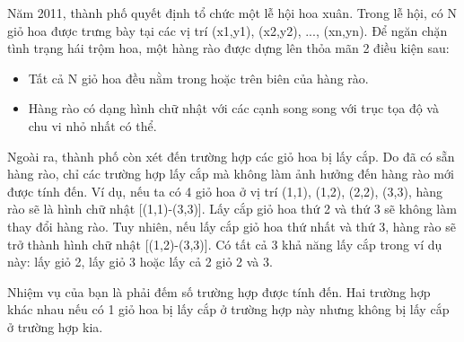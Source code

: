 Năm 2011, thành phố quyết định tổ chức một lễ hội hoa xuân. Trong lễ hội, có N giỏ hoa được trưng bày tại các vị trí (x1,y1), (x2,y2), ..., (xn,yn). Để ngăn chặn tình trạng hái trộm hoa, một hàng rào được dựng lên thỏa mãn 2 điều kiện sau:  
\begin{itemize}
	\item     Tất cả N giỏ hoa đều nằm trong hoặc trên biên của hàng rào.   
\end{itemize}
\begin{itemize}
	\item     Hàng rào có dạng hình chữ nhật với các cạnh song song với trục tọa độ và chu vi nhỏ nhất có thể.   
\end{itemize}




   Ngoài ra, thành phố còn xét đến trường hợp các giỏ hoa bị lấy cắp. Do đã có sẵn hàng rào, chỉ các trường hợp lấy cắp mà không làm ảnh hưởng đến hàng rào mới được tính đến. Ví dụ, nếu ta có 4 giỏ hoa ở vị trí (1,1), (1,2), (2,2), (3,3), hàng rào sẽ là hình chữ nhật [(1,1)-(3,3)]. Lấy cắp giỏ hoa thứ 2 và thứ 3 sẽ không làm thay đổi hàng rào. Tuy nhiên, nếu lấy cắp giỏ hoa thứ nhất và thứ 3, hàng rào sẽ trở thành hình chữ nhật [(1,2)-(3,3)]. Có tất cả 3 khả năng lấy cắp trong ví dụ này: lấy giỏ 2, lấy giỏ 3 hoặc lấy cả 2 giỏ 2 và 3.   





   Nhiệm vụ của bạn là phải đếm số trường hợp được tính đến. Hai trường hợp khác nhau nếu có 1 giỏ hoa bị lấy cắp ở trường hợp này nhưng không bị lấy cắp ở trường hợp kia.